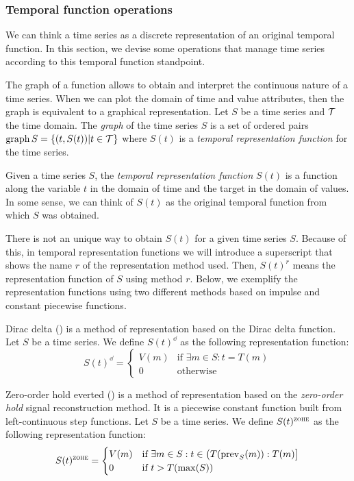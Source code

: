 \subsubsection{Temporal function operations}
\label{sec:model:tfunc}

We can think a time series as a discrete representation of an original
temporal function. In this section, we devise some operations that
manage time series according to this temporal function standpoint.

The graph of a function allows to obtain and interpret the continuous
nature of a time series. When we can plot the domain of time and value
attributes, then the graph is equivalent to a graphical
representation.  Let $S$ be a time series and $\cal{T}$ the time
domain. The \emph{graph} of the time series $S$ is a set of ordered
pairs $\operatorname*{graph} S =\{(t,S(t))|t\in \cal{T}\}$ where $S(t)$ is a
\emph{temporal representation function} for the time series.

Given a time series $S$, the \emph{temporal representation function}
$S(t)$ is a function along the variable $t$ in the domain of time and
the target in the domain of values. In some sense, we can think of
$S(t)$ as the original temporal function from which $S$ was obtained.

There is not an unique way to obtain $S(t)$ for a given time series
$S$. Because of this, in temporal representation functions we will
introduce a superscript that shows the name $r$ of the representation
method used. Then, $S(t)^r$ means the representation function of $S$
using method $r$. Below, we exemplify the representation functions
using two different methods based on impulse and constant piecewise
functions.


\begin{definition} 
  Dirac delta (\dd) is a method of representation based on the Dirac
  delta function. Let $S$ be a time series. We define $S(t)^\dd$ as
  the following \dd{} representation function:
  \[
  S(t)^\dd
  =  \begin{cases}
          V(m) & \text{if } \exists m\in S:t=T(m) \\
          0    & \text{otherwise}
  \end{cases}
  \]
\end{definition}

\begin{definition}
  Zero-order hold everted (\zohe{}) is a method of representation
  based on the \emph{zero-order hold} signal reconstruction method. It
  is a piecewise constant function built from left-continuous step
  functions.  Let $S$ be a time series. We define $S(t)^\zohe$ as the
  following representation function:
  \[
  S(t)^\zohe 
  = \begin{cases}
    V(m) & \text{if } \exists m\in S: t\in \big(T(\prev_S(m)):T(m)\big]\\
    0    & \text{if } t > T(\max(S)) 
  \end{cases}
  \]
\end{definition}

